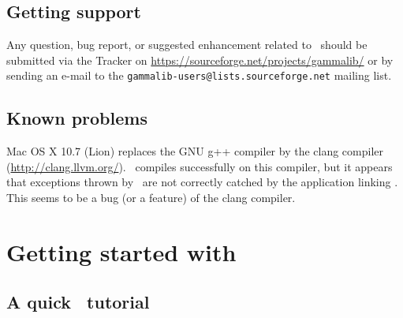 \documentclass{article}[12pt,a4]
\begin{document}
\subsection{Getting support}

Any question, bug report, or suggested enhancement related to \this\ should be submitted
via the Tracker on 
\url{https://sourceforge.net/projects/gammalib/}
or by sending an e-mail to the\break
{\tt gammalib-users@lists.sourceforge.net}
mailing list.


\subsection{Known problems}
\label{sec:knownproblems}

Mac OS X 10.7 (Lion) replaces the GNU g++ compiler by the clang compiler
(\url{http://clang.llvm.org/}).
\this\ compiles successfully on this compiler, but it appears that exceptions thrown by
\this\ are not correctly catched by the application linking \this.
This seems to be a bug (or a feature) of the clang compiler.


%
\clearpage
\section{Getting started with \this}

\subsection{A quick \this\ tutorial}

\end{document}
